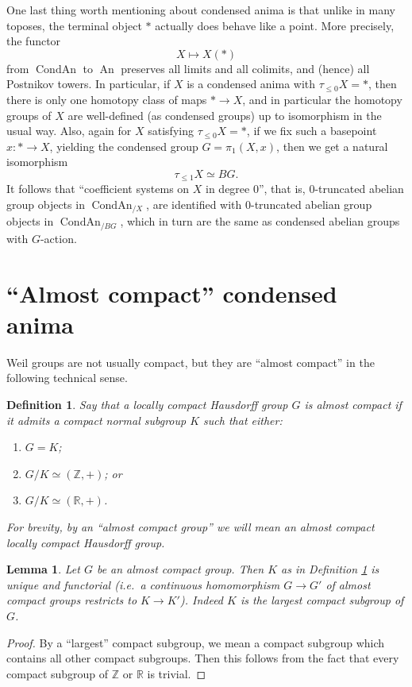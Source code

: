 \documentclass[12pt]{article}
\newtheorem{lemma}[theorem]{Lemma}
\newtheorem{definition}[theorem]{Definition}
\theoremstyle{definition}
\newcommand{\on}{\operatorname}
\newcommand{\mbb}{\mathbb}
\begin{document}
One last thing worth mentioning about condensed anima is that unlike in many toposes, the terminal object $\ast$ actually does behave like a point.  More precisely, the functor
$$X\mapsto X(\ast)$$
from $\on{CondAn}$ to $\on{An}$ preserves all limits and all colimits, and (hence) all Postnikov towers.  In particular, if $X$ is a condensed anima with $\tau_{\leq 0}X=\ast$, then there is only one homotopy class of maps $\ast \to X$, and in particular the homotopy groups of $X$ are well-defined (as condensed groups) up to isomorphism in the usual way.  Also, again for $X$ satisfying $\tau_{\leq 0}X=\ast$, if we fix such a basepoint $x:\ast \to X$, yielding the condensed group $G=\pi_1(X,x)$, then we get a natural isomorphism
$$\tau_{\leq 1}X \simeq BG.$$
It follows that ``coefficient systems on $X$ in degree $0$'', that is, $0$-truncated abelian group objects in $\on{CondAn}_{/X}$, are identified with $0$-truncated abelian group objects in $\on{CondAn}_{/BG}$, which in turn are the same as condensed abelian groups with $G$-action.

\section{``Almost compact'' condensed anima}

Weil groups are not usually compact, but they are ``almost compact'' in the following technical sense.

\begin{definition}\label{acomp}
Say that a locally compact Hausdorff group $G$ is \emph{almost compact} if it admits a compact normal subgroup $K$ such that either:
\begin{enumerate}
\item $G=K$;
\item $G/K\simeq (\mbb{Z},+)$; or
\item $G/K\simeq (\mbb{R},+)$.
\end{enumerate}
For brevity, by an ``almost compact group'' we will mean an almost compact locally compact Hausdorff group.
\end{definition}

\begin{lemma}\label{maxcompact}
Let $G$ be an almost compact group.  Then $K$ as in Definition \ref{acomp} is unique and functorial (i.e.\ a continuous homomorphism $G\to G'$ of almost compact groups restricts to $K\to K'$).  Indeed $K$ is the largest compact subgroup of $G$.
\end{lemma}
\begin{proof}
By a ``largest'' compact subgroup, we mean a compact subgroup which contains all other compact subgroups.  Then this follows from the fact that every compact subgroup of $\mbb{Z}$ or $\mbb{R}$ is trivial.
\end{proof}
\end{document}
